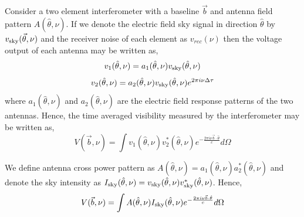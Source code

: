\documentclass[12pt,preprint]{aastex}
\newcommand{\volt}{{v}}
\newcommand{\vis}{{V}}
\newcommand{\sky}{{\rm sky}}
\newcommand{\bmvolt}{{a}}
\newcommand{\bm}{{A}}
\newcommand{\thhat}{{\hat\theta}}
\newcommand{\ifngexp}{{e^{-\frac{2\pi i\nu\vec{b}\cdot\thhat}{c}}}}
\newcommand{\dfngexp}{{e^{2\pi i\nu \Delta \tau}}}
\begin{document}
Consider a two element interferometer with a baseline $\vec b$ and antenna field pattern $A(\thhat, \nu)$. If we denote the electric field sky signal in direction $\thhat$ by $\volt_\sky(\vec \theta, \nu)$ and the receiver noise of each element as $\volt_{rec}(\nu)$ then the voltage output of each antenna may be written as,  
\begin{equation}
\volt_{1}(\thhat, \nu) = \bmvolt_{1}(\thhat,\nu)\volt_\sky(\thhat,\nu)\nonumber\\
\end{equation}
\begin{equation}
\volt_{2} (\thhat, \nu)= \bmvolt_{2}(\thhat,\nu)\volt_\sky(\thhat,\nu)\dfngexp\nonumber\\
\end{equation}
where $\bmvolt_{1}(\thhat,\nu)$ and $\bmvolt_{2}(\thhat,\nu)$ are the electric field response patterns 
of the two antennas.
Hence, the time averaged visibility measured by the interferometer may be written as, 
\begin{equation}
\vis(\vec b, \nu) =  \int  \volt_{1}(\thhat,\nu)  \volt_{2}^{*} (\thhat, \nu) \ifngexp d\Omega 
\label{eq1}
\end{equation}

We define antenna cross power pattern as  $\bm(\thhat,\nu)=\bmvolt_{1}(\thhat,\nu)\bmvolt_{2}^{*}(\thhat,\nu)$ and denote the sky intensity as  $I_\sky(\thhat,\nu)=\volt_\sky(\thhat,\nu)\volt_\sky^{*}(\thhat,\nu)$. Hence, 
\begin{equation}
\vis(\vec b,\nu) = \int \bm(\thhat, \nu) I_\sky(\thhat,\nu) \ifngexp d\Omega
\label{eq2}
\end{equation}
\end{document}
